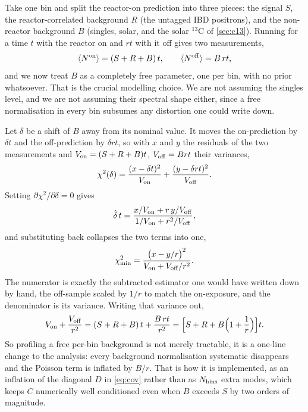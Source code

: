 \documentclass[aps,prd,superscriptaddress,nofootinbib,longbibliography,notitlepage,11pt]{revtex4-2}
\begin{document}
Take one bin and split the reactor-on prediction into three pieces: the signal $S$, the
reactor-correlated background $R$ (the untagged IBD positrons), and the non-reactor
background $B$ (singles, solar, and the solar $^{13}$C of \cref{sec:c13}).  Running for a
time $t$ with the reactor on and $rt$ with it off gives two measurements,
\begin{equation}
\langle N^{\rm on}\rangle=(S+R+B)\,t,
\qquad
\langle N^{\rm off}\rangle=B\,rt,
\label{eq:onoffmeans}
\end{equation}
and we now treat $B$ as a completely free parameter, one per bin, with no prior whatsoever.
That is the crucial modelling choice.  We are not assuming the singles level, and we are not
assuming their spectral shape either, since a free normalisation in every bin subsumes any
distortion one could write down.

Let $\delta$ be a shift of $B$ away from its nominal value.  It moves the on-prediction by
$\delta t$ and the off-prediction by $\delta rt$, so with $x$ and $y$ the residuals of the
two measurements and $V_{\rm on}=(S+R+B)t$, $V_{\rm off}=Brt$ their variances,
\begin{equation}
\chi^2(\delta)=\frac{(x-\delta t)^2}{V_{\rm on}}+\frac{(y-\delta rt)^2}{V_{\rm off}} .
\label{eq:onoffchi2}
\end{equation}
Setting $\partial\chi^2/\partial\delta=0$ gives
\begin{equation}
\hat\delta\,t=\frac{x/V_{\rm on}+r\,y/V_{\rm off}}{1/V_{\rm on}+r^{2}/V_{\rm off}},
\label{eq:deltahat}
\end{equation}
and substituting back collapses the two terms into one,
\begin{equation}
\chi^2_{\min}=\frac{\big(x-y/r\big)^2}{V_{\rm on}+V_{\rm off}/r^{2}} .
\label{eq:onoffprofiled}
\end{equation}
The numerator is exactly the subtracted estimator one would have written down by hand, the
off-sample scaled by $1/r$ to match the on-exposure, and the denominator is its variance.
Writing that variance out,
\begin{equation}
V_{\rm on}+\frac{V_{\rm off}}{r^{2}}
=(S+R+B)\,t+\frac{B\,rt}{r^{2}}
=\Big[S+R+B\Big(1+\frac1r\Big)\Big]t .
\label{eq:onoff}
\end{equation}
So profiling a free per-bin background is not merely tractable, it is a one-line change to
the analysis: every background normalisation systematic disappears and the Poisson term is
inflated by $B/r$.  That is how it is implemented, as an inflation of the diagonal $D$ in
\cref{eq:cov} rather than as $N_{\rm bins}$ extra modes, which keeps $C$ numerically well
conditioned even when $B$ exceeds $S$ by two orders of magnitude.
\end{document}
